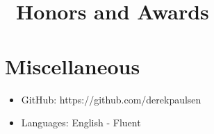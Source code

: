 \documentclass{resume}
\begin{document}
\section{\ Honors and Awards}

\section{Miscellaneous}
\begin{itemize}[parsep=0.5ex]
  \item GitHub: https://github.com/derekpaulsen
  \item Languages: English - Fluent
\end{itemize}

%
%
\end{document}
